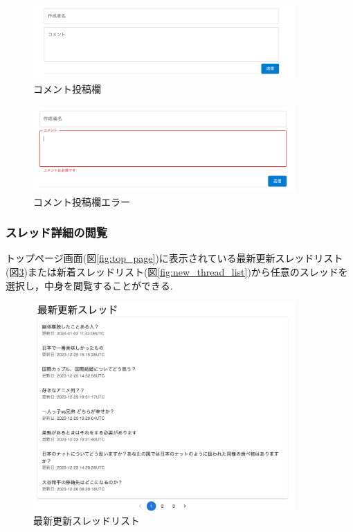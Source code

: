 \documentclass[b5paper,12pt,dvipdfmx]{jsreport}
\begin{document}
\begin{figure}[H]
	\centering
    \includegraphics[width=100mm,height=28.19mm]{./img/feature/comment_textfield.png}
	\caption{コメント投稿欄}
	\label{fig:comment_textfield}
\end{figure}

\begin{figure}[H]
	\centering
    \includegraphics[width=100mm,height=32.90mm]{./img/feature/comment_textfield_error.png}
	\caption{コメント投稿欄エラー}
	\label{fig:comment_textfield_error}
\end{figure}

\subsubsection{スレッド詳細の閲覧}
トップページ画面(図\ref{fig:top_page})に表示されている最新更新スレッドリスト(図\ref{fig:latest_update_thread_list})または新着スレッドリスト(図\ref{fig:new_thread_list})から任意のスレッドを選択し，中身を閲覧することができる.

\begin{figure}[H]
	\centering
    \includegraphics[width=100mm,height=79.79mm]{./img/feature/latest_update_thread_list.png}
	\caption{最新更新スレッドリスト}
	\label{fig:latest_update_thread_list}
\end{figure}
\end{document}
